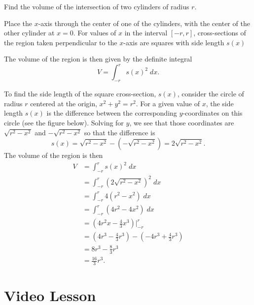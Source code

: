 \documentclass[handout]{ximera}
\begin{document}
\begin{example}  Find the volume of the intersection of two cylinders of radius $r$. 


Place the $x$-axis through the center of one of the cylinders, with the center of the other cylinder at $x = 0$.
For values of $x$ in the interval $[-r, r]$, cross-sections of the region taken perpendicular 
to the $x$-axis are squares with side length $s(x)$ %

The volume of the region is then given by the definite integral
\[
V = \int_{-r}^r s(x)^2 \; dx.
\]

To find the side length of the square cross-section, $s(x)$, consider the circle of radius $r$ centered at the origin, $x^2 + y^2 = r^2$. For a given value of $x$, the side 
length $s(x)$ is the difference between the corresponding $y$-coordinates on this circle (see the figure below). Solving for $y$, we see that those coordinates are 
$\sqrt{r^2 - x^2}$ and $-\sqrt{r^2 - x^2}$ so that the difference is 
\[
s(x) = \sqrt{r^2 - x^2}-(-\sqrt{r^2 - x^2}) = 2\sqrt{r^2 - x^2}.
\]
The volume of the region  is then
\begin{align*}
V &= \int_{-r}^r s(x)^2 \; dx\\
  &= \int_{-r}^r \left(2\sqrt{r^2 - x^2}\right)^2 \; dx\\
  &= \int_{-r}^r 4(r^2 - x^2) \; dx\\
  &= \int_{-r}^r (4r^2 - 4x^2) \; dx\\
  &= \left(4r^2x - \frac43x^3\right)\bigg|_{-r}^r\\
  &= \left(4r^3 - \frac43r^3\right) - \left(-4r^3 + \frac43 r^3\right)\\
  &= 8r^3 - \frac83 r^3\\
  &= \frac{16}{3} r^3.
\end{align*}

\end{example}



\section{Video Lesson}

\begin{center}
\begin{foldable}
\end{foldable}
\end{center}
\end{document}

